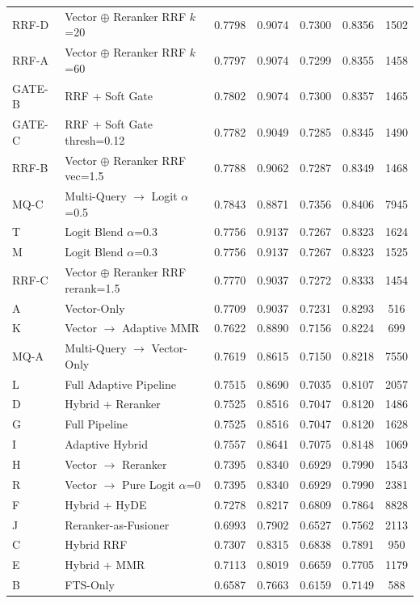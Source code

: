 \documentclass[11pt]{article}
\begin{document}
\begin{longtable}{llccccc}
RRF-D & Vector $\oplus$ Reranker RRF $k$=20 & 0.7798 & 0.9074 & 0.7300 & 0.8356 & 1502 \\
RRF-A & Vector $\oplus$ Reranker RRF $k$=60 & 0.7797 & 0.9074 & 0.7299 & 0.8355 & 1458 \\
GATE-B & RRF + Soft Gate & 0.7802 & 0.9074 & 0.7300 & 0.8357 & 1465 \\
GATE-C & RRF + Soft Gate thresh=0.12 & 0.7782 & 0.9049 & 0.7285 & 0.8345 & 1490 \\
RRF-B & Vector $\oplus$ Reranker RRF vec=1.5 & 0.7788 & 0.9062 & 0.7287 & 0.8349 & 1468 \\
MQ-C & Multi-Query $\to$ Logit $\alpha$=0.5 & 0.7843 & 0.8871 & 0.7356 & 0.8406 & 7945 \\
T & Logit Blend $\alpha$=0.3 & 0.7756 & 0.9137 & 0.7267 & 0.8323 & 1624 \\
M & Logit Blend $\alpha$=0.3 & 0.7756 & 0.9137 & 0.7267 & 0.8323 & 1525 \\
RRF-C & Vector $\oplus$ Reranker RRF rerank=1.5 & 0.7770 & 0.9037 & 0.7272 & 0.8333 & 1454 \\
A & Vector-Only & 0.7709 & 0.9037 & 0.7231 & 0.8293 & 516 \\
K & Vector $\to$ Adaptive MMR & 0.7622 & 0.8890 & 0.7156 & 0.8224 & 699 \\
MQ-A & Multi-Query $\to$ Vector-Only & 0.7619 & 0.8615 & 0.7150 & 0.8218 & 7550 \\
L & Full Adaptive Pipeline & 0.7515 & 0.8690 & 0.7035 & 0.8107 & 2057 \\
D & Hybrid + Reranker & 0.7525 & 0.8516 & 0.7047 & 0.8120 & 1486 \\
G & Full Pipeline & 0.7525 & 0.8516 & 0.7047 & 0.8120 & 1628 \\
I & Adaptive Hybrid & 0.7557 & 0.8641 & 0.7075 & 0.8148 & 1069 \\
H & Vector $\to$ Reranker & 0.7395 & 0.8340 & 0.6929 & 0.7990 & 1543 \\
R & Vector $\to$ Pure Logit $\alpha$=0 & 0.7395 & 0.8340 & 0.6929 & 0.7990 & 2381 \\
F & Hybrid + HyDE & 0.7278 & 0.8217 & 0.6809 & 0.7864 & 8828 \\
J & Reranker-as-Fusioner & 0.6993 & 0.7902 & 0.6527 & 0.7562 & 2113 \\
C & Hybrid RRF & 0.7307 & 0.8315 & 0.6838 & 0.7891 & 950 \\
E & Hybrid + MMR & 0.7113 & 0.8019 & 0.6659 & 0.7705 & 1179 \\
B & FTS-Only & 0.6587 & 0.7663 & 0.6159 & 0.7149 & 588 \\
\end{longtable}
\end{document}
